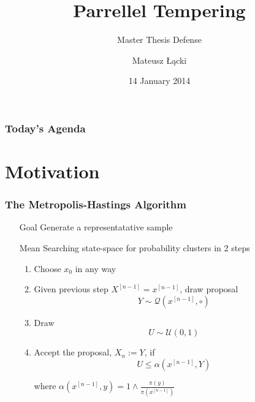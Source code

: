 \documentclass[xetex]{beamer}
\title[Parrellel Tempering]{Parrellel Tempering }
\subtitle{Master Thesis Defense}
\date{14 January 2014}
\author[Łącki]{Mateusz Łącki}
\institute[UW]{Uniwersytet Warszawski}
\begin{document}


	\begin{frame}
		\titlepage
	\end{frame}


	\begin{frame}
		\frametitle{Today's Agenda}
		\tableofcontents
	\end{frame}

\section{Motivation}


	\begin{frame}[t]\frametitle{The Metropolis-Hastings Algorithm}
	    
		\begin{itemize}
			\item[Goal] 	Generate a representatative sample
			\item[Mean]		Searching state-space for probability clusters in 2 steps
			\begin{enumerate}
				\item 	Choose $x_0$ in any way

				\item  	Given previous step $X^{[n-1]} = x^{[n-1]}$, draw proposal
					$$ Y \sim \mathcal{Q}(x^{[n-1]}, \circ) $$

				\item 	Draw
					$$ U \sim \mathcal{U}(0,1) $$	

				\item 	Accept the proposal, $X_{n} := Y$, if 
					$$ U \leq \alpha(x^{[n-1]},Y) $$
				\item[where] $\alpha (x^{[n-1]},y) = 1 \wedge \frac{\pi(y)}{\pi(x^{[n-1]})}$ 
			\end{enumerate}

		\end{itemize}
	
	\end{frame}

\end{document}
